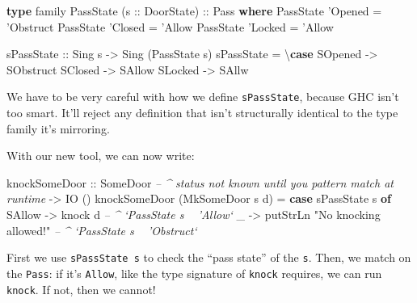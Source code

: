 \documentclass[]{article}
\newenvironment{Shaded}{}{}
\newcommand{\CommentTok}[1]{\textcolor[rgb]{0.38,0.63,0.69}{\textit{#1}}}
\newcommand{\DataTypeTok}[1]{\textcolor[rgb]{0.56,0.13,0.00}{#1}}
\newcommand{\FunctionTok}[1]{\textcolor[rgb]{0.02,0.16,0.49}{#1}}
\newcommand{\KeywordTok}[1]{\textcolor[rgb]{0.00,0.44,0.13}{\textbf{#1}}}
\newcommand{\NormalTok}[1]{#1}
\newcommand{\OtherTok}[1]{\textcolor[rgb]{0.00,0.44,0.13}{#1}}
\newcommand{\StringTok}[1]{\textcolor[rgb]{0.25,0.44,0.63}{#1}}
\begin{document}
\begin{Shaded}
\begin{Highlighting}[]
\KeywordTok{type}\NormalTok{ family }\DataTypeTok{PassState}\NormalTok{ (}\OtherTok{s ::} \DataTypeTok{DoorState}\NormalTok{)}\OtherTok{ ::} \DataTypeTok{Pass} \KeywordTok{where}
    \DataTypeTok{PassState}\NormalTok{ '}\DataTypeTok{Opened} \FunctionTok{=}\NormalTok{ '}\DataTypeTok{Obstruct}
    \DataTypeTok{PassState}\NormalTok{ '}\DataTypeTok{Closed} \FunctionTok{=}\NormalTok{ '}\DataTypeTok{Allow}
    \DataTypeTok{PassState}\NormalTok{ '}\DataTypeTok{Locked} \FunctionTok{=}\NormalTok{ '}\DataTypeTok{Allow}

\OtherTok{sPassState ::} \DataTypeTok{Sing}\NormalTok{ s }\OtherTok{->} \DataTypeTok{Sing}\NormalTok{ (}\DataTypeTok{PassState}\NormalTok{ s)}
\NormalTok{sPassState }\FunctionTok{=}\NormalTok{ \textbackslash{}}\KeywordTok{case}
    \DataTypeTok{SOpened} \OtherTok{->} \DataTypeTok{SObstruct}
    \DataTypeTok{SClosed} \OtherTok{->} \DataTypeTok{SAllow}
    \DataTypeTok{SLocked} \OtherTok{->} \DataTypeTok{SAllw}
\end{Highlighting}
\end{Shaded}

We have to be very careful with how we define \texttt{sPassState}, because GHC
isn't too smart. It'll reject any definition that isn't structurally identical
to the type family it's mirroring.

With our new tool, we can now write:

\begin{Shaded}
\begin{Highlighting}[]
\NormalTok{knockSomeDoor}
\OtherTok{    ::} \DataTypeTok{SomeDoor}     \CommentTok{-- ^ status not known until you pattern match at runtime}
    \OtherTok{->} \DataTypeTok{IO}\NormalTok{ ()}
\NormalTok{knockSomeDoor (}\DataTypeTok{MkSomeDoor}\NormalTok{ s d) }\FunctionTok{=} \KeywordTok{case}\NormalTok{ sPassState s }\KeywordTok{of}
    \DataTypeTok{SAllow} \OtherTok{->}\NormalTok{ knock d                           }\CommentTok{-- ^ `PassState s ~ 'Allow`}
\NormalTok{    _      }\OtherTok{->}\NormalTok{ putStrLn }\StringTok{"No knocking allowed!"}   \CommentTok{-- ^ `PassState s ~ 'Obstruct`}
\end{Highlighting}
\end{Shaded}

First we use \texttt{sPassState\ s} to check the ``pass state'' of the
\texttt{s}. Then, we match on the \texttt{Pass}: if it's \texttt{Allow}, like
the type signature of \texttt{knock} requires, we can run \texttt{knock}. If
not, then we cannot!
\end{document}
